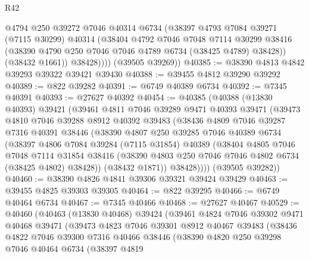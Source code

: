 \begin{lexlean}{R42}
\begin{coremodule}
{              @4794
              @250
              @39272
              @7046
              @40314
              @6734
              (@38397
                @4793
                @7084
                @39271
                (@7115 @30299)
                @40314
                (@38404
                  @4792
                  @7046
                  @7048
                  @7114
                  @30299
                  @38416
                  (@38390 @4790 @250 @7046 @7046 @4789 @6734 (@38425 @4789) @38428))
                (@38432 @1661))
              @38428))))
      (@39505 @39269))
@40385 := @38390 @4813 @4842 @39293 @39322 @39421 @39430
@40388 := @39455 @4812 @39290 @39292
@40389 := @822 @39282
@40391 := @6749 @40389 @6734
@40392 := @7345 @40391
@40393 := @27627 @40392
@40454 := @40385
    (@40388
      (@13830 @40393)
      @39421
      (@39461
        @4811
        @7046
        @39289
        @9471
        @40393
        @39471
        (@39473
          @4810
          @7046
          @39288
          @8912
          @40392
          @39483
          (@38436
            @4809
            @7046
            @39287
            @7316
            @40391
            @38446
            (@38390
              @4807
              @250
              @39285
              @7046
              @40389
              @6734
              (@38397
                @4806
                @7084
                @39284
                (@7115 @31854)
                @40389
                (@38404
                  @4805
                  @7046
                  @7048
                  @7114
                  @31854
                  @38416
                  (@38390 @4803 @250 @7046 @7046 @4802 @6734 (@38425 @4802) @38428))
                (@38432 @1871))
              @38428))))
      (@39505 @39282))
@40460 := @38390 @4826 @4841 @39306 @39321 @39424 @39429
@40463 := @39455 @4825 @39303 @39305
@40464 := @822 @39295
@40466 := @6749 @40464 @6734
@40467 := @7345 @40466
@40468 := @27627 @40467
@40529 := @40460
    (@40463
      (@13830 @40468)
      @39424
      (@39461
        @4824
        @7046
        @39302
        @9471
        @40468
        @39471
        (@39473
          @4823
          @7046
          @39301
          @8912
          @40467
          @39483
          (@38436
            @4822
            @7046
            @39300
            @7316
            @40466
            @38446
            (@38390
              @4820
              @250
              @39298
              @7046
              @40464
              @6734
              (@38397
                @4819
}
\end{coremodule}
\end{lexlean}
